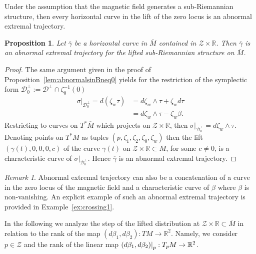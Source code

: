 \documentclass{amsart}
\theoremstyle{plain}
\newtheorem{proposition}[theorem]{Proposition}
\theoremstyle{definition}
\theoremstyle{remark}
\newtheorem{remark}[thm]{Remark}
\newcommand{\R}{\mathbb{R}}
\newcommand{\diff}{d}%
\newcommand{\sr}{sub-{R}ie\-man\-nian }
\newcommand{\distr}{\mathcal{D}}								%
\newcommand{\B}{\beta}
\newcommand{\lift}[1]{\overline{#1}} 							%
\newcommand\restr[2]{{													%
  \left.\kern-\nulldelimiterspace 					
  #1 																			
  \right|_{#2} 														
  }}
\begin{document}
Under the assumption that the magnetic field generates a sub-Riemannian structure, then every horizontal curve in the lift of the zero locus is an abnormal extremal trajectory.

\begin{proposition}\label{p:dbp}
Let  $\lift \gamma$ be a horizontal curve in $\lift M$ contained in  $\mathcal{Z}\times \R$. Then $\lift \gamma$ is an abnormal extremal trajectory for the lifted \sr structure on $\lift{M}$.
\end{proposition}

\begin{proof} The same argument given in the proof of Proposition~\ref{lem:abnormalsinBneq0} yields for the restriction of the symplectic form  $\distr_{0}^{\perp}:=\distr^{\perp}\cap \zeta_{0}^{-1}(0)$ 
\begin{align*}
\sigma|_{\distr_{0}^{\perp}}=d\left(\zeta_{w}\tau\right)&=d\zeta_{w}\wedge \tau+\zeta_{w}d\tau\\
&=d\zeta_{w}\wedge \tau-\zeta_{w}\beta.
\end{align*}
Restricting to curves on $T^{*}\lift M$ which projects on $\mathcal{Z}\times \R$, then $\sigma|_{\distr_{0}^{\perp}}=d\zeta_{w}\wedge \tau$.
Denoting points on $T^{*}\lift M$ as tuples $(\lift p,\zeta_{1},\zeta_{2},\zeta_{0},\zeta_{w})$ then the lift $(\lift \gamma(t),0,0,0,c)$ of the curve $\lift \gamma(t)$ on $\mathcal{Z}\times \R\subset \lift M$, for some $c\neq 0$, is a characteristic curve of $\sigma|_{\distr_{0}^{\perp}}$. Hence $\lift \gamma$ is an abnormal extremal trajectory.
\end{proof}

\begin{remark} Abnormal extremal trajectory can also be a concatenation of a curve in the zero locus of the magnetic field and a characteristic curve of $\beta$ where $\beta$ is non-vanishing. An explicit example of such an abnormal extremal trajectory is provided in Example~\ref{ex:crossing1}.
\end{remark}




In the following we analyze the step of the lifted distribution at $ \mathcal{Z} \times \R \subset \lift M$ in relation to the rank of the map $(\diff \B_1,\diff \B_2):TM\to\R^2$. Namely, we consider $p\in  \mathcal{Z}$ and the rank of the linear map $\restr{(\diff \B_1,\diff \B_2)}{p}:T_pM\to\R^2$.
\end{document}
